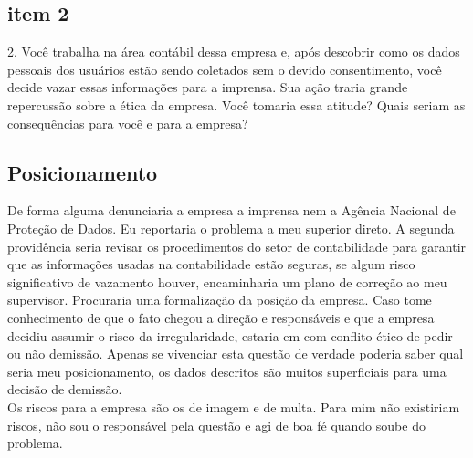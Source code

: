 \subsection{item 2}
2. Você trabalha na área contábil dessa empresa e, após descobrir como os dados pessoais dos usuários estão sendo coletados sem o devido consentimento, você decide vazar essas informações para a imprensa. Sua ação traria grande repercussão sobre a ética da empresa. Você tomaria essa atitude? Quais seriam as consequências para você e para a empresa?\\
\subsection{Posicionamento}
De forma alguma denunciaria a empresa a imprensa nem a Agência Nacional de Proteção de Dados. Eu reportaria o problema a meu superior direto. A segunda providência seria revisar os procedimentos do setor de contabilidade para garantir que as informações usadas na contabilidade estão seguras, se algum risco significativo de vazamento houver, encaminharia um plano de correção ao meu supervisor.  Procuraria uma formalização da posição da empresa. Caso tome conhecimento de que o fato chegou a direção e responsáveis e que a empresa decidiu assumir o risco da irregularidade, estaria em com conflito ético de pedir ou não demissão. Apenas se vivenciar esta questão de verdade poderia saber qual seria meu posicionamento, os dados descritos são muitos superficiais para uma decisão de demissão.
\\
Os riscos para a empresa são os de imagem e de multa. Para mim não existiriam riscos, não sou o responsável pela questão e agi de boa fé quando soube do problema.\\

